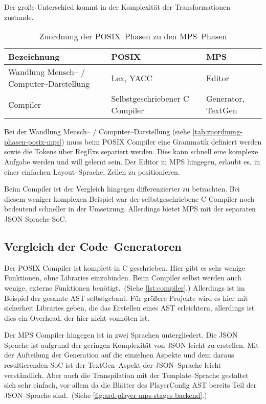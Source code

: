 Der große Unterschied kommt in der Komplexität der Transformationen zustande.
\begin{table}[ht]
    \centering
    \begin{tabular}{|p{}|p{}|p{}|}
        \hline
        Bezeichnung                               & \ac{POSIX}                     & \ac{MPS}           \\
        \hline
        \hline
        Wandlung Mensch-- / Computer--Darstellung & Lex, \ac{YACC}                 & Editor             \\
        \hline
        Compiler                                  & Selbstgeschriebener C Compiler & Generator, TextGen \\
        \hline
    \end{tabular}
    \caption{Zuordnung der \acs{POSIX}--Phasen zu den \acs{MPS}--Phasen}
    \label{tab:zuordnung-phasen-posix-mps}
\end{table}
Bei der Wandlung Mensch-- / Computer--Darstellung (siehe \autoref{tab:zuordnung-phasen-posix-mps}) muss beim \ac{POSIX} Compiler eine Grammatik definiert werden sowie die Tokens über \acp{RegEx} separiert werden.
Dies kann schnell eine komplexe Aufgabe werden und will gelernt sein.
Der Editor in \ac{MPS} hingegen, erlaubt es, in einer einfachen Layout--Sprache, Zellen zu positionieren.

Beim Compiler ist der Vergleich hingegen differenzierter zu betrachten.
Bei diesem weniger komplexen Beispiel war der selbstgeschriebene C Compiler noch bedeutend schneller in der Umsetzung.
Allerdings bietet \ac{MPS} mit der separaten \ac{JSON} Sprache \ac{SoC}.

\subsection{Vergleich der Code--Generatoren}\label{subsec:vergleich-der-code--generatoren}
Der \ac{POSIX} Compiler ist komplett in C geschrieben.
Hier gibt es sehr wenige Funktionen, ohne Libraries einzubinden.
Beim Compiler selbst werden auch wenige, externe Funktionen benötigt.\ (Siehe \autoref{lst:compiler}.)
Allerdings ist im Beispiel der gesamte \ac{AST} selbstgebaut.
Für größere Projekte wird es hier mit sicherheit Libraries geben, die das Erstellen eines \ac{AST} erleichtern, allerdings ist dies ein Overhead, der hier nicht vonnöten ist.

Der \ac{MPS} Compiler hingegen ist in zwei Sprachen untergliedert.
Die \ac{JSON} Sprache ist aufgrund der geringen Komplexität von \ac{JSON} leicht zu erstellen.
Mit der Aufteilung der Generation auf die einzelnen Aspekte und dem daraus resultierenden \ac{SoC} ist der TextGen--Aspekt der \ac{JSON}--Sprache leicht verständlich.
Aber auch die Transpilation mit der Template--Sprache gestaltet sich sehr einfach, vor allem da die Blätter des {\ttfamily PlayerConfig} \ac{AST} bereits Teil der \ac{JSON}--Sprache sind.\ (Siehe \autoref{fig:ard-player-mps-stages-backend}.)

